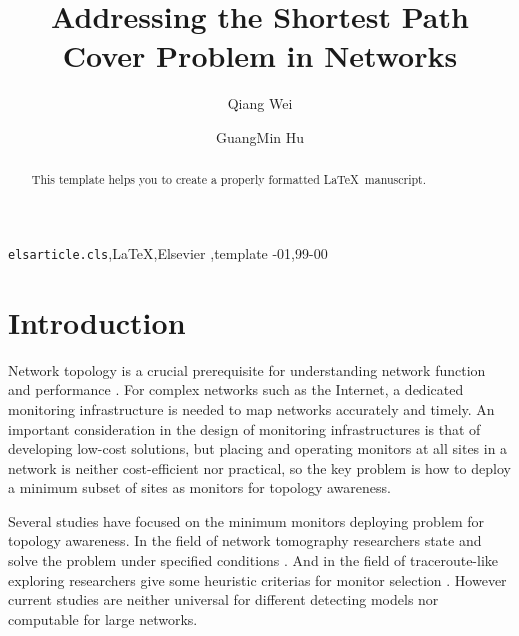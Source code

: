 \documentclass[review]{elsarticle}
\begin{document}
\begin{frontmatter}

\title{Addressing the Shortest Path Cover Problem in Networks}

\author[mymainaddress,mysecondaryaddress]{Qiang Wei}


\author[mymainaddress]{GuangMin Hu}


\address[mymainaddress]{School of Communication and Information Engineering, University of Electronic Science and Technology of China, Chengdu, 610051, China}
\address[mysecondaryaddress]{Science and Technology On Blind Signal Processing Laboratory, Chengdu, 610041, China}

\begin{abstract}
This template helps you to create a properly formatted \LaTeX\ manuscript.
\end{abstract}

\begin{keyword}
\texttt{elsarticle.cls}\sep \LaTeX\sep Elsevier \sep template
-01\sep  99-00
\end{keyword}

\end{frontmatter}


\section{Introduction}

Network topology is a crucial prerequisite for understanding network function and performance \cite{yook2002modeling, albert2002statistical}. For complex networks such as the Internet, a dedicated monitoring infrastructure is needed to map networks accurately and timely.  An important consideration in the design of monitoring infrastructures is that of developing low-cost solutions, but placing and operating monitors at all sites in a network is neither cost-efficient nor practical, so the key problem is how to deploy a minimum subset of sites as monitors for topology awareness.

Several studies have focused on the minimum monitors deploying problem for topology awareness. In the field of network tomography \cite{vardi1996network} researchers state and solve the problem under specified conditions \cite{kumar2006practical,natu2008probe,ma2014inferring,ma2015optimal,he2017robust}. And in the field of traceroute-like exploring \cite{burch1999mapping} researchers give some heuristic criterias for monitor selection \cite{dall2006exploring,han2008method,zou2009logic}.  However current studies are neither universal for different detecting models nor computable for large networks.   
\end{document}
